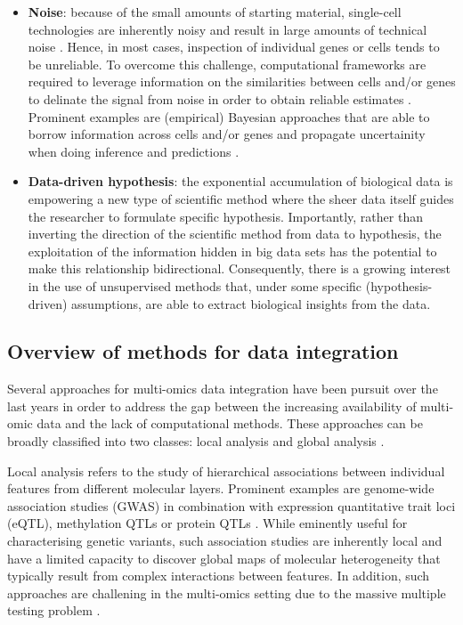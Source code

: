 \begin{itemize}
	\item \textbf{Noise}: because of the small amounts of starting material, single-cell technologies are inherently noisy and result in large amounts of technical noise \cite{Stegle2015}. Hence, in most cases, inspection of individual genes or cells tends to be unreliable. To overcome this challenge, computational frameworks are required to leverage information on the similarities between cells and/or genes to delinate the signal from noise in order to obtain reliable estimates \cite{Vallejos2015}. Prominent examples are (empirical) Bayesian approaches that are able to borrow information across cells and/or genes and propagate uncertainity when doing inference and predictions \cite{Kharchenko2014}.

	\item \textbf{Data-driven hypothesis}: the exponential accumulation of biological data is empowering a new type of scientific method where the sheer data itself guides the researcher to formulate specific hypothesis. Importantly, rather than inverting the direction of the scientific method from data to hypothesis, the exploitation of the information hidden in big data sets has the potential to make this relationship bidirectional. Consequently, there is a growing interest in the use of unsupervised methods that, under some specific (hypothesis-driven) assumptions, are able to extract biological insights from the data.


\end{itemize}

\subsection{Overview of methods for data integration}

Several approaches for multi-omics data integration have been pursuit over the last years in order to address the gap between the increasing availability of multi-omic data and the lack of computational methods. These approaches can be broadly classified into two classes: local analysis and global analysis \cite{Ritchie2015}.

Local analysis refers to the study of hierarchical associations between individual features from different molecular layers. Prominent examples are genome-wide association studies (GWAS) in combination with expression quantitative trait loci (eQTL), methylation QTLs or protein QTLs \cite{VanDerWijst2018,Chen2016,Pierce2018,Bonder2016}. While eminently useful for characterising genetic variants, such association studies are inherently local and have a limited capacity to discover global maps of molecular heterogeneity that typically result from complex interactions between features. In addition, such approaches are challening in the multi-omics setting due to the massive multiple testing problem \cite{Sul2015}.

